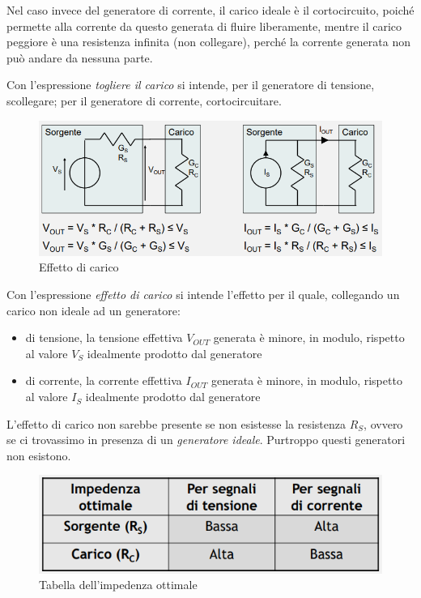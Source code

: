 \documentclass{article}
\begin{document}
\vspace{3mm}

Nel caso invece del generatore di corrente, il carico ideale è il cortocircuito, poiché permette alla corrente da questo generata di fluire liberamente, mentre il carico peggiore è una resistenza infinita (non collegare), perché la corrente generata non può andare da nessuna parte. 

\vspace{3mm}

Con l'espressione \textit{togliere il carico} si intende, per il generatore di tensione, scollegare; per il generatore di corrente, cortocircuitare.

\begin{figure}[h]
  \centering
  \includegraphics[scale=0.6]{IM_effetto_di_carico}
  \caption{Effetto di carico}
  \label{Schema_effetto_di_carico}
\end{figure}

Con l'espressione \textit{effetto di carico} si intende l'effetto per il quale, collegando un carico non ideale ad un generatore:

\begin{itemize}
\item di tensione, la tensione effettiva $V_{OUT}$ generata è minore, in modulo, rispetto al valore $V_S$ idealmente prodotto dal generatore
\item di corrente, la corrente effettiva $I_{OUT}$ generata è minore, in modulo, rispetto al valore $I_S$ idealmente prodotto dal generatore
\end{itemize}
\clearpage
L'effetto di carico non sarebbe presente se non esistesse la resistenza $R_S$, ovvero se ci trovassimo in presenza di un \textit{generatore ideale}. Purtroppo questi generatori non esistono.

\begin{figure}[h]
  \centering
  \includegraphics[scale=0.7]{IM_impedenza_ottimale}
  \caption{Tabella dell'impedenza ottimale}
  \label{Schema_impedenza_ottimale}
\end{figure}
\end{document}
